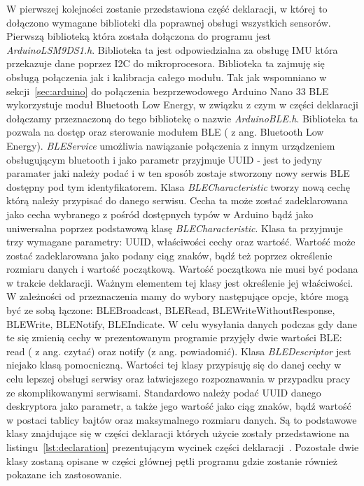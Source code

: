 W pierwszej kolejności zostanie przedstawiona część deklaracji, w której to dołączono wymagane biblioteki dla poprawnej obsługi wszystkich sensorów. Pierwszą biblioteką która została dołączona do programu jest \textit{Arduino\textunderscore LSM9DS1.h}. Biblioteka ta jest odpowiedzialna za obsługę IMU która przekazuje dane poprzez I2C do mikroprocesora. Biblioteka ta zajmuję się obsługą połączenia jak i kalibracja całego modułu.
Tak jak wspomniano w sekcji~\ref{sec:arduino} do połączenia bezprzewodowego Arduino Nano 33 BLE wykorzystuje moduł Bluetooth Low Energy, w związku z czym w części deklaracji dołączamy przeznaczoną do tego bibliotekę o nazwie \textit{ArduinoBLE.h}. Biblioteka ta pozwala na dostęp oraz sterowanie modułem BLE ( z ang. Bluetooth Low Energy). \textit{BLEService} umożliwia nawiązanie połączenia z innym urządzeniem obsługującym bluetooth i jako parametr przyjmuje UUID - jest to jedyny paramater jaki należy podać i w ten sposób zostaje stworzony nowy serwis BLE dostępny pod tym identyfikatorem. Klasa \textit{BLECharacteristic} tworzy nową cechę którą należy przypisać do danego serwisu. Cecha ta może zostać zadeklarowana jako cecha wybranego z pośród dostępnych typów w Arduino bądź jako uniwersalna poprzez podstawową klasę \textit{BLECharacteristic}. Klasa ta przyjmuje trzy wymagane parametry: UUID, właściwości cechy oraz wartość. Wartość może zostać zadeklarowana jako podany ciąg znaków, bądź też poprzez określenie rozmiaru danych i wartość początkową. Wartość początkowa nie musi być podana w trakcie deklaracji. Ważnym elementem tej klasy jest określenie jej właściwości. W zależności od przeznaczenia mamy do wybory następujące opcje, które mogą być ze sobą łączone: BLEBroadcast, BLERead, BLEWriteWithoutResponse, BLEWrite, BLENotify, BLEIndicate. W celu wysyłania danych podczas gdy dane te się zmienią cechy w prezentowanym programie przyjęły dwie wartości BLE: read ( z ang. czytać) oraz notify (z ang. powiadomić). Klasa \textit{BLEDescriptor} jest niejako klasą pomocniczną. Wartości tej klasy przypisuję się do danej cechy w celu lepszej obsługi serwisy oraz łatwiejszego rozpoznawania w przypadku pracy ze skomplikowanymi serwisami. Standardowo należy podać UUID danego deskryptora jako parametr, a także jego wartość jako ciąg znaków, bądź wartość w postaci tablicy bajtów oraz maksymalnego rozmiaru danych. Są to podstawowe klasy znajdujące się w części deklaracji których użycie zostały przedstawione na listingu~\ref{lst:declaration} prezentującym wycinek części deklaracji~\cite{ArduinoBLE}. Pozostałe dwie klasy zostaną opisane w części głównej pętli programu gdzie zostanie również pokazane ich zastosowanie\cite{bleSpec}. 

